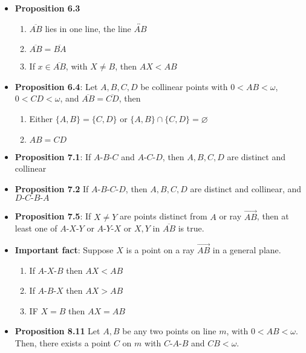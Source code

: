 \documentclass{report}
\begin{document}
    \pagebreak 
    \begin{itemize}
        \item \textbf{Proposition 6.3}
            \begin{enumerate}[label=(\alph*)]
                \item $\overline{AB}$ lies in one line, the line $\overleftrightarrow{AB} $
                \item $\overline{AB} = \overline{BA} $
                \item If $x\in \overline{AB}$, with $X \ne B$, then $AX < AB $
            \end{enumerate}
        \item \textbf{Proposition 6.4}: Let $A,B,C,D$ be collinear points with $0 < AB < \omega$, $0< CD<\omega$, and $\overline{AB} = \overline{CD}$, then
        \begin{enumerate}[label=(\alph*)]
                \item Either $\{A,B\} = \{C,D\}$ or $\{A,B\} \cap \{C,D\} = \varnothing$
                \item $AB = CD$
            \end{enumerate}
        \item \textbf{Proposition 7.1}: If $A\text{-}B\text{-}C$ and $A\text{-}C\text{-}D$, then $A,B,C,D$ are distinct and collinear 
        \item \textbf{Proposition 7.2} If $A\text{-}B\text{-}C\text{-}D$, then $A,B,C,D$ are distinct and collinear, and $D\text{-}C\text{-}B\text{-}A $
        \item \textbf{Proposition 7.5}: If $X \ne Y$ are points distinct from $A$ or ray $\overrightarrow{AB}$, then at least one of $ A\text{-}X\text{-}Y$ or $ A\text{-}Y\text{-}X$ or $X,Y$ in $ \overline{AB}$ is true.
        \item \textbf{Important fact}:  Suppose $X$ is a point on a ray $\overrightarrow{AB}$ in a general plane.
            \begin{enumerate}
                \item If $ A\text{-}X\text{-}B$ then $AX < AB $
                \item If $ A\text{-}B\text{-}X$ then $AX > AB $
                \item IF $X = B$ then $AX = AB$
            \end{enumerate}
        \item \textbf{Proposition 8.11} Let $A,B$ be any two points on line $m$, with $0 < AB <\omega$. Then, there exists a point $C$ on $m$ with $ C\text{-}A\text{-}B$ and $ CB < \omega$.

\end{itemize}
\end{document}
